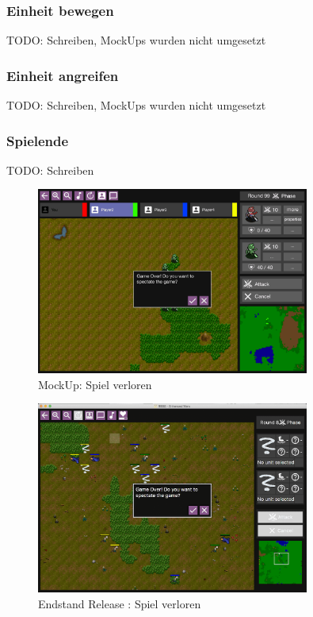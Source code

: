 \documentclass[12pt, titlepage]{scrartcl}
\newcommand{\RN}[1]{%
	\textup{\uppercase\expandafter{\romannumeral#1}}%
}
\begin{document}
			\subsubsection{Einheit bewegen}
				TODO: Schreiben, MockUps wurden nicht umgesetzt
			\subsubsection{Einheit angreifen}
				TODO: Schreiben, MockUps wurden nicht umgesetzt
			\subsubsection{Spielende}
				TODO: Schreiben
				\begin{figure}[H] 
					\centering
					\includegraphics[width=0.8\textwidth]{images/mockUps/GameOver.png}
					\caption{MockUp: Spiel verloren}
					\label{Game_Lost_2}
				\end{figure}
				\begin{figure}[H] 
					\centering
					\includegraphics[width=0.8\textwidth]{images/endOfRelease/GameOver.png}
					\caption{Endstand Release \RN{3}: Spiel verloren}
					\label{End_Game_Lost}
				\end{figure}
\end{document}
